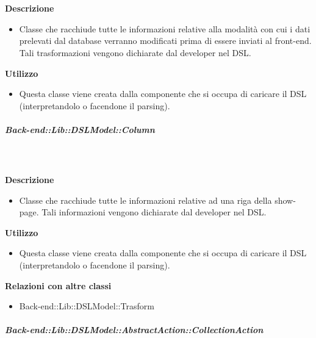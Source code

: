         \textbf{\\ \\ Descrizione} 
          \begin{itemize}
            \item[] Classe che racchiude tutte le informazioni relative alla modalità con cui i dati prelevati dal database verranno modificati prima di essere inviati al front-end.
Tali trasformazioni vengono dichiarate dal developer nel DSL.
          \end{itemize}      
        \textbf{Utilizzo}  
          \begin{itemize}
            \item[] Questa classe viene creata dalla componente che si occupa di caricare il DSL (interpretandolo o facendone il parsing).
          \end{itemize}
      \subparagraph{Back-end::Lib::DSLModel::Column}
        
        \textbf{\\ \\ Descrizione} 
          \begin{itemize}
            \item[] Classe che racchiude tutte le informazioni relative ad una riga della show-page. Tali informazioni vengono dichiarate dal developer nel DSL.


          \end{itemize}      
        \textbf{Utilizzo}  
          \begin{itemize}
            \item[] Questa classe viene creata dalla componente che si occupa di caricare il DSL (interpretandolo o facendone il parsing).
          \end{itemize}
          \textbf{Relazioni con altre classi}
          \begin{itemize}
              \item{Back-end::Lib::DSLModel::Trasform}
          \end{itemize}
      \subparagraph{Back-end::Lib::DSLModel::AbstractAction::CollectionAction}
        
